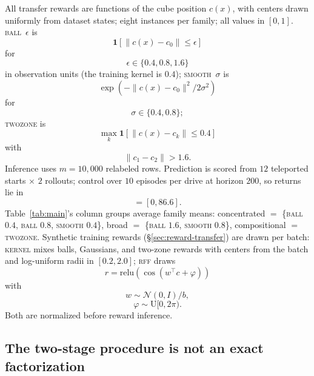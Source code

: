 \documentclass{article}
\newcommand{\ind}[1]{\mathbf{1}\!\left[#1\right]}
\newcommand{\cube}{c}
\begin{document}
All transfer rewards are functions of the cube position $\cube(x)$, with centers drawn uniformly from dataset states; eight instances per family; all values in $[0,1]$.
\textsc{ball}~$\epsilon$ is
\begin{equation}
\ind{\|\cube(x)-c_0\|\le\epsilon}
\end{equation}
for
\begin{equation}
\epsilon\in\{0.4,0.8,1.6\}
\end{equation}
in observation units (the training kernel is $0.4$); \textsc{smooth}~$\sigma$ is
\begin{equation}
\exp(-\|\cube(x)-c_0\|^2/2\sigma^2)
\end{equation}
for
\begin{equation}
\sigma\in\{0.4,0.8\};
\end{equation}
\textsc{twozone} is
\begin{equation}
\max_k\ind{\|\cube(x)-c_k\|\le0.4}
\end{equation}
with
\begin{equation}
\|c_1-c_2\|>1.6.
\end{equation}
Inference uses $m=10{,}000$ relabeled rows.
Prediction is scored from $12$ teleported starts $\times$ $2$ rollouts; control over $10$ episodes per drive at horizon $200$, so returns lie in
\begin{equation}
[0,\sum_{t<200}\gamma^t]=[0,86.6].
\end{equation}
Table~\ref{tab:main}'s column groups average family means: concentrated $=$ \{\textsc{ball} $0.4$, \textsc{ball} $0.8$, \textsc{smooth} $0.4$\}, broad $=$ \{\textsc{ball} $1.6$, \textsc{smooth} $0.8$\}, compositional $=$ \textsc{twozone}.
Synthetic training rewards (\S\ref{sec:reward-transfer}) are drawn per batch: \textsc{kernel} mixes balls, Gaussians, and two-zone rewards with centers from the batch and log-uniform radii in $[0.2,2.0]$; \textsc{rff} draws
\begin{equation}
r=\mathrm{relu}(\cos(w^{\top}\cube+\varphi))
\end{equation}
with
\begin{equation}
w\sim\mathcal{N}(0,I)/b,
\end{equation}
\begin{equation}
\varphi\sim\mathrm{U}[0,2\pi).
\end{equation}
Both are normalized before reward inference.

\subsection{The two-stage procedure is not an exact factorization}
\label{app:twostage}
\end{document}
